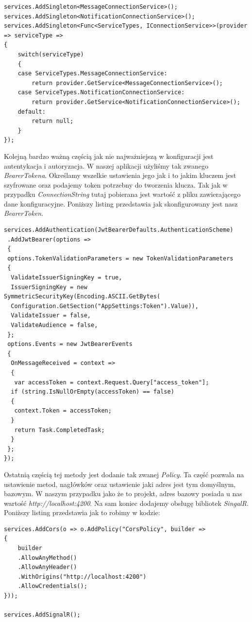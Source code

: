 \documentclass[12pt,a4paper]{article}
\begin{document}
\begin{lstlisting}[caption={Wzorzec Singleton w konfiguracji}]
services.AddSingleton<MessageConnectionService>();
services.AddSingleton<NotificationConnectionService>();
services.AddSingleton<Func<ServiceTypes, IConnectionService>>(provider => serviceType =>
{
	switch(serviceType)
	{
	case ServiceTypes.MessageConnectionService:
		return provider.GetService<MessageConnectionService>();
	case ServiceTypes.NotificationConnectionService:
		return provider.GetService<NotificationConnectionService>();
	default:
		return null;
	}
});
\end{lstlisting}

\hspace*{0.7cm} Kolejną bardzo ważną częścią jak nie najważniejszą w konfiguracji jest autentykacja i autoryzacja. W naszej aplikacji użyliśmy tak zwanego \textit{BearerTokena}. Określamy wszelkie ustawienia jego jak i to jakim kluczem jest szyfrowane oraz podajemy token potrzebny do tworzenia klucza. Tak jak w przypadku \textit{ConnectionString} tutaj pobierana jest wartość z pliku zawierającego dane konfiguracyjne. Poniższy listing przedstawia jak skonfigurowany jest nasz \textit{BearerToken}.

\begin{lstlisting}[caption={BearerToken - konfiguracja}]
services.AddAuthentication(JwtBearerDefaults.AuthenticationScheme)
 .AddJwtBearer(options =>
 {
 options.TokenValidationParameters = new TokenValidationParameters
 {
  ValidateIssuerSigningKey = true,
  IssuerSigningKey = new  SymmetricSecurityKey(Encoding.ASCII.GetBytes(
  Configuration.GetSection("AppSettings:Token").Value)),
  ValidateIssuer = false,
  ValidateAudience = false,
 };
 options.Events = new JwtBearerEvents
 {
  OnMessageReceived = context =>
  {
   var accessToken = context.Request.Query["access_token"];
  if (string.IsNullOrEmpty(accessToken) == false)
  {
   context.Token = accessToken;
  }
   return Task.CompletedTask;
  }
 };
});
\end{lstlisting}    

\hspace*{0.7cm} Ostatnią częścią tej metody jest dodanie tak zwanej \textit{Policy}. Ta część pozwala na ustawienie metod, nagłówków oraz ustawienie jaki adres jest tym domyślnym, bazowym. W naszym przypadku jako że to projekt, adres bazowy posiada u nas wartość \textit{http://localhost:4200}. Na sam koniec dodajemy obsługę bibliotek \textit{SingalR}. Poniższy listing przedstawia jak to robimy w kodzie:

\begin{lstlisting}[caption={Polityka oraz dodanie SingalR w konfiguracji}]
services.AddCors(o => o.AddPolicy("CorsPolicy", builder =>
{
	builder
	.AllowAnyMethod()
	.AllowAnyHeader()
	.WithOrigins("http://localhost:4200")
	.AllowCredentials();
}));

services.AddSignalR();
\end{lstlisting}
\end{document}
